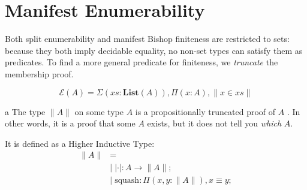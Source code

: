 \section{Manifest Enumerability} \label{manifest-enumerability}
Both split enumerability and manifest Bishop finiteness are restricted to sets:
because they both imply decidable equality, no non-set types can satisfy them as
predicates.
To find a more general predicate for finiteness, we \emph{truncate} the
membership proof.
\begin{rm-definition}
  \begin{equation}
    \mathcal{E}(A) = \Sigma {(\mathit{xs} : \mathbf{List}(A))} , \Pi {(x : A)} , \lVert x \in \mathit{xs} \rVert
  \end{equation}
\end{rm-definition}
\begin{rm-definition}a \label{prop-trunc}
  The type \(\lVert A \rVert\) on some type \(A\) is a propositionally truncated
  proof of \(A\) \cite[3.7]{hottbook}.
  In other words, it is a proof that some \(A\) exists, but it does not tell you
  \emph{which} \(A\).

  It is defined as a Higher Inductive Type:
  \begin{equation}
    \begin{aligned}
      \lVert A \rVert &= \\
        &| \; \lvert \cdot \rvert : A \rightarrow \lVert A \rVert ; \\
        &| \; \text{squash} : \Pi {(x, y : \lVert A \rVert)} , x \equiv y  ; \\
    \end{aligned}
  \end{equation}


\end{rm-definition}
